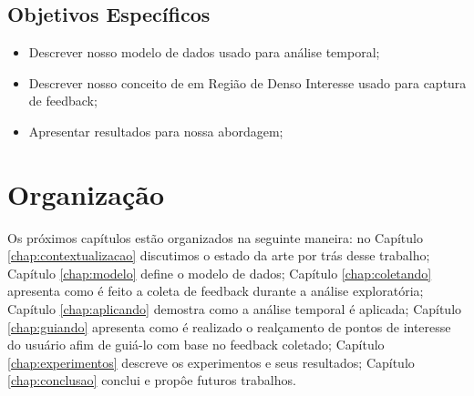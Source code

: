 \subsection{Objetivos Específicos}

\begin{itemize}
	\item Descrever nosso modelo de dados usado para análise temporal;
	\item Descrever nosso conceito de em Região de Denso Interesse usado para captura de feedback;
	\item Apresentar resultados para nossa abordagem;
\end{itemize}

\section{Organização}

Os próximos capítulos estão organizados na seguinte maneira: no Capítulo \ref{chap:contextualizacao} discutimos o estado da arte por trás desse trabalho; Capítulo \ref{chap:modelo} define o modelo de dados; Capítulo \ref{chap:coletando} apresenta como é feito a coleta de feedback durante a análise exploratória; Capítulo \ref{chap:aplicando} demostra como a análise temporal é aplicada; Capítulo \ref{chap:guiando} apresenta como é realizado o realçamento de pontos de interesse do usuário afim de guiá-lo com base no feedback coletado; Capítulo \ref{chap:experimentos} descreve os experimentos e seus resultados; Capítulo \ref{chap:conclusao} conclui e propôe futuros trabalhos.
